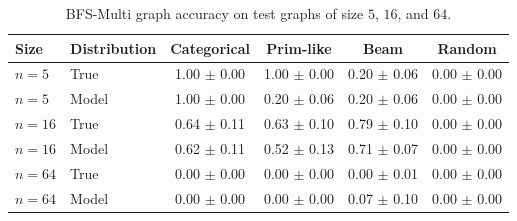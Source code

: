 \begin{table}[hbt!]
    \centering
    \small
    \begin{tabular}{llcccc}
        \toprule
        \textbf{Size} & \textbf{Distribution} & \textbf{Categorical} & \textbf{Prim-like} & \textbf{Beam} & \textbf{Random} \\
        \midrule
        $n=5$ & True & 1.00 $\pm$ 0.00 & 1.00 $\pm$ 0.00 & 0.20 $\pm$ 0.06 & 0.00 $\pm$ 0.00 \\
        $n=5$ & Model & 1.00 $\pm$ 0.00 & 0.20 $\pm$ 0.06 & 0.20 $\pm$ 0.06 & 0.00 $\pm$ 0.00 \\
        $n=16$ & True & 0.64 $\pm$ 0.11 & 0.63 $\pm$ 0.10 & 0.79 $\pm$ 0.10 & 0.00 $\pm$ 0.00 \\
        $n=16$ & Model & 0.62 $\pm$ 0.11 & 0.52 $\pm$ 0.13 & 0.71 $\pm$ 0.07 & 0.00 $\pm$ 0.00 \\
        $n=64$ & True & 0.00 $\pm$ 0.00 & 0.00 $\pm$ 0.00 & 0.00 $\pm$ 0.01 & 0.00 $\pm$ 0.00 \\
        $n=64$ & Model & 0.00 $\pm$ 0.00 & 0.00 $\pm$ 0.00 & 0.07 $\pm$ 0.10 & 0.00 $\pm$ 0.00 \\
        \bottomrule
    \end{tabular}
    \caption{BFS-Multi graph accuracy on test graphs of size $5$, $16$, and $64$.}
    \label{tab:bfs-graph-accuracy}
\end{table}
